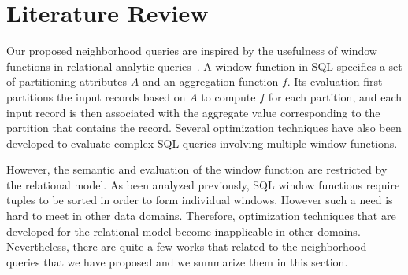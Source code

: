 \chapter{Literature Review}
Our proposed neighborhood queries are inspired
by the usefulness of window functions in relational analytic queries~\cite{zemke2012s}.
A window function in SQL specifies a set of partitioning attributes 
$A$ and an aggregation function $f$.
Its evaluation first partitions the input records based on $A$ to compute 
$f$ for each partition, and each input record is then associated with the aggregate 
value corresponding to the partition that contains the record.
Several optimization techniques \cite{cao2012optimization, bellamkonda2013adaptive}
have also been developed to evaluate complex SQL queries 
involving multiple window functions.

However, the semantic and evaluation of the window function are restricted by the 
relational model. As been analyzed previously, SQL window functions require
tuples to be sorted in order to form individual windows. However such a need
is hard to meet in other data domains. Therefore, optimization techniques
that are developed for the relational model become inapplicable in other domains. 
Nevertheless, there are quite a few works that related to the neighborhood
queries that we have proposed and we summarize them in this section. 




